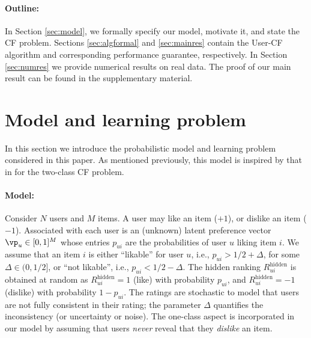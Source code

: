 \documentclass{article}
\newcommand\nuser{N} %
\newcommand\nitem{M}
\newcommand\R{R^{\mathrm{hidden}}}
\begin{document}
\vspace{-0.15cm}

\paragraph{Outline:}
In Section \ref{sec:model}, we formally specify our model,  motivate it, and state the CF problem. 
Sections \ref{sec:algformal} and \ref{sec:mainres} contain the User-CF algorithm and corresponding performance guarantee, respectively. 
In Section \ref{sec:numres} we provide numerical results on real data.
The proof of our main result can be found in the supplementary material. 

\vspace{-0.2cm}
\section{\label{sec:model}Model and learning problem}
\vspace{-0.2cm}

In this section we introduce the probabilistic model and learning problem considered in this paper. 
As mentioned previously, this model is inspired by that in \cite{bresler_latent_2014} for the two-class CF problem. 
%
\paragraph{Model:}
Consider $\nuser$ users and $\nitem$ items. 
A user may like an item ($+1$), or dislike an item ($-1$). 
Associated with each user is an (unknown) latent preference vector $\vp_u \in [0,1]^M$ whose entries $p_{ui}$ are the probabilities of user $u$ liking item $i$. 
We assume that an item $i$ is either ``likable'' for user $u$, i.e., $p_{ui} > 1/2 + \Delta$, for some $\Delta \in (0,1/2]$, or ``not likable'', i.e., $p_{ui} < 1/2 - \Delta$. 
The hidden ranking $\R_{ui}$ %
is obtained at random as $\R_{ui} = 1$ (like) with probability $p_{ui}$, and $\R_{ui} = -1$ (dislike) with probability $1 - p_{ui}$. 
The ratings are stochastic to model that users are not fully consistent 
in their rating; the parameter $\Delta$ quantifies the inconsistency (or uncertainty or noise). 
The one-class aspect is incorporated in our model by assuming that users \emph{never} reveal that they \emph{dislike} an item. 
\end{document}
